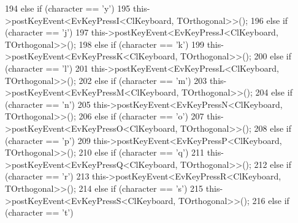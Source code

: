 \begin{DoxyCode}
{194                         \textcolor{keywordflow}{else} \textcolor{keywordflow}{if} (character == \textcolor{charliteral}{'y'})
195                                 this->postKeyEvent<EvKeyPressI<ClKeyboard, TOrthogonal>>();
196                         \textcolor{keywordflow}{else} \textcolor{keywordflow}{if} (character == \textcolor{charliteral}{'j'})
197                                 this->postKeyEvent<EvKeyPressJ<ClKeyboard, TOrthogonal>>();
198                         \textcolor{keywordflow}{else} \textcolor{keywordflow}{if} (character == \textcolor{charliteral}{'k'})
199                                 this->postKeyEvent<EvKeyPressK<ClKeyboard, TOrthogonal>>();
200                         \textcolor{keywordflow}{else} \textcolor{keywordflow}{if} (character == \textcolor{charliteral}{'l'})
201                                 this->postKeyEvent<EvKeyPressL<ClKeyboard, TOrthogonal>>();
202                         \textcolor{keywordflow}{else} \textcolor{keywordflow}{if} (character == \textcolor{charliteral}{'m'})
203                                 this->postKeyEvent<EvKeyPressM<ClKeyboard, TOrthogonal>>();
204                         \textcolor{keywordflow}{else} \textcolor{keywordflow}{if} (character == \textcolor{charliteral}{'n'})
205                                 this->postKeyEvent<EvKeyPressN<ClKeyboard, TOrthogonal>>();
206                         \textcolor{keywordflow}{else} \textcolor{keywordflow}{if} (character == \textcolor{charliteral}{'o'})
207                                 this->postKeyEvent<EvKeyPressO<ClKeyboard, TOrthogonal>>();
208                         \textcolor{keywordflow}{else} \textcolor{keywordflow}{if} (character == \textcolor{charliteral}{'p'})
209                                 this->postKeyEvent<EvKeyPressP<ClKeyboard, TOrthogonal>>();
210                         \textcolor{keywordflow}{else} \textcolor{keywordflow}{if} (character == \textcolor{charliteral}{'q'})
211                                 this->postKeyEvent<EvKeyPressQ<ClKeyboard, TOrthogonal>>();
212                         \textcolor{keywordflow}{else} \textcolor{keywordflow}{if} (character == \textcolor{charliteral}{'r'})
213                                 this->postKeyEvent<EvKeyPressR<ClKeyboard, TOrthogonal>>();
214                         \textcolor{keywordflow}{else} \textcolor{keywordflow}{if} (character == \textcolor{charliteral}{'s'})
215                                 this->postKeyEvent<EvKeyPressS<ClKeyboard, TOrthogonal>>();
216                         \textcolor{keywordflow}{else} \textcolor{keywordflow}{if} (character == \textcolor{charliteral}{'t'})
}
\end{DoxyCode}
